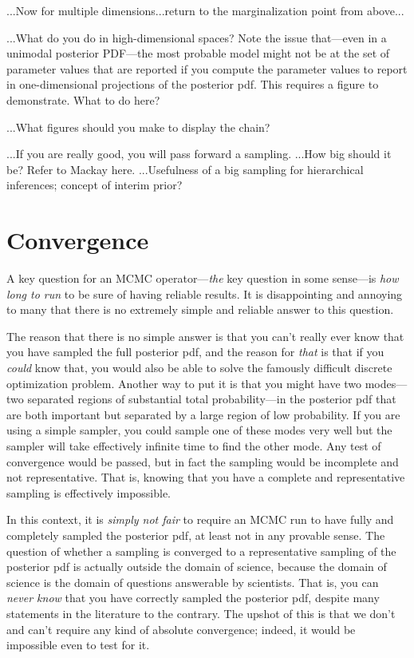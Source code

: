 \documentclass[12pt,twoside,pdftex]{article}
\begin{document}
...Now for multiple dimensions...return to the marginalization point
from above...

...What do you do in high-dimensional spaces?  Note the issue
that---even in a unimodal posterior PDF---the most probable model
might not be at the set of parameter values that are reported if you
compute the parameter values to report in one-dimensional projections
of the posterior pdf.  This requires a figure to demonstrate.  What to
do here?

...What figures should you make to display the chain?

...If you are really good, you will pass forward a sampling.
...How big should it be? Refer to Mackay here.
...Usefulness of a big sampling for hierarchical inferences; concept of interim prior?

\section{Convergence}

A key question for an MCMC operator---\emph{the} key question in some
sense---is \emph{how long to run} to be sure of having reliable
results.
It is disappointing and annoying to many that there is no extremely
simple and reliable answer to this question.

The reason that there is no simple answer is that you can't really
ever know that you have sampled the full posterior pdf, and the reason
for \emph{that} is that if you \emph{could} know that, you would also
be able to solve the famously difficult discrete optimization
problem.
Another way to put it is that you might have two modes---two separated
regions of substantial total probability---in the posterior pdf that
are both important but separated by a large region of low probability.
If you are using a simple sampler, you could sample one of these modes
very well but the sampler will take effectively infinite time to find
the other mode.
Any test of convergence would be passed, but in fact the sampling
would be incomplete and not representative.
That is, knowing that you have a complete and representative sampling
is effectively impossible.

In this context,
  it is \emph{simply not fair} to require an MCMC run to have fully and completely
  sampled the posterior pdf,
  at least not in any provable sense.
The question of whether a sampling is converged to a representative sampling
  of the posterior pdf is actually outside the domain of science,
  because the domain of science is the domain of questions answerable by scientists.
That is, you can \emph{never know} that you have correctly sampled the posterior pdf,
  despite many statements in the literature to the contrary.%
The upshot of this is that we don't and can't require any kind of absolute convergence;
  indeed, it would be impossible even to test for it.
\end{document}
